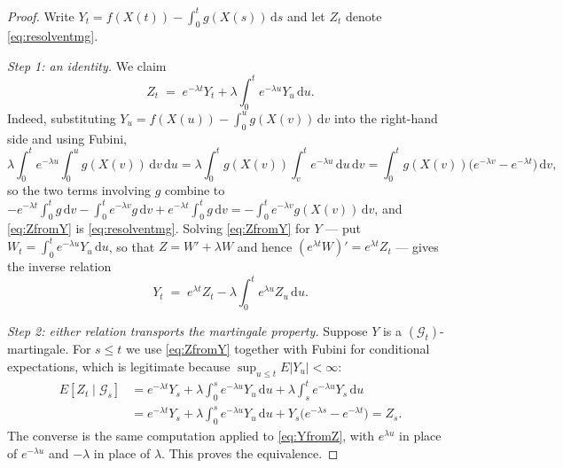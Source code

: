 \documentclass[11pt,a4paper]{article}
\theoremstyle{plain}
\theoremstyle{definition}
\theoremstyle{remark}
\newcommand{\Gilt}{\mathcal{G}}
\newcommand{\dif}{\,\mathrm{d}}
\begin{document}
\begin{proof}
  Write $Y_t = f(X(t)) - \int_0^t g(X(s))\dif s$ and let $Z_t$ denote
  \eqref{eq:resolventmg}.

  \emph{Step 1: an identity.}  We claim
  \begin{equation}
    \label{eq:ZfromY}
    Z_t \;=\; e^{-\lambda t} Y_t + \lambda \int_0^t e^{-\lambda u} Y_u \dif u .
  \end{equation}
  Indeed, substituting $Y_u = f(X(u)) - \int_0^u g(X(v))\dif v$ into the
  right-hand side and using Fubini,
  \[
    \lambda \int_0^t e^{-\lambda u} \! \int_0^u \! g(X(v)) \dif v \dif u
      = \lambda \int_0^t \! g(X(v)) \! \int_v^t \! e^{-\lambda u} \dif u \dif v
      = \int_0^t g(X(v)) \bigl( e^{-\lambda v} - e^{-\lambda t} \bigr) \dif v ,
  \]
  so the two terms involving $g$ combine to
  $- e^{-\lambda t}\int_0^t g \dif v - \int_0^t e^{-\lambda v} g \dif v
    + e^{-\lambda t}\int_0^t g\dif v = - \int_0^t e^{-\lambda v} g(X(v))\dif v$,
  and \eqref{eq:ZfromY} is \eqref{eq:resolventmg}.  Solving \eqref{eq:ZfromY} for
  $Y$ --- put $W_t = \int_0^t e^{-\lambda u}Y_u\dif u$, so that $Z = W' + \lambda W$
  and hence $(e^{\lambda t}W)' = e^{\lambda t}Z_t$ --- gives the inverse relation
  \begin{equation}
    \label{eq:YfromZ}
    Y_t \;=\; e^{\lambda t} Z_t - \lambda \int_0^t e^{\lambda u} Z_u \dif u .
  \end{equation}

  \emph{Step 2: either relation transports the martingale property.}
  Suppose $Y$ is a $(\Gilt_t)$-martingale.  For $s \leq t$ we use
  \eqref{eq:ZfromY} together with Fubini for conditional expectations, which is
  legitimate because $\sup_{u\leq t}E|Y_u| < \infty$:
  \begin{align*}
    E[Z_t \mid \Gilt_s]
      &= e^{-\lambda t} Y_s + \lambda \int_0^s e^{-\lambda u} Y_u \dif u
         + \lambda \int_s^t e^{-\lambda u} Y_s \dif u \\
      &= e^{-\lambda t} Y_s + \lambda \int_0^s e^{-\lambda u} Y_u \dif u
         + Y_s \bigl( e^{-\lambda s} - e^{-\lambda t} \bigr)
       = Z_s .
  \end{align*}
  The converse is the same computation applied to \eqref{eq:YfromZ}, with
  $e^{\lambda u}$ in place of $e^{-\lambda u}$ and $-\lambda$ in place of
  $\lambda$.  This proves the equivalence.


\end{proof}
\end{document}
